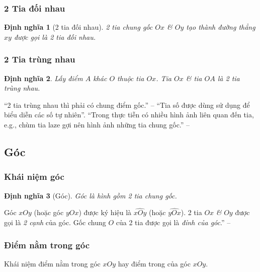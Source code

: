 \documentclass{article}
\numberwithin{equation}{section}
\newtheorem{dinhnghia}{Định nghĩa}[section]
\begin{document}
\subsubsection{2 Tia đối nhau}

\begin{dinhnghia}[2 tia đối nhau]
	2 tia chung gốc $Ox$ \textit{\&} $Oy$ tạo thành đường thẳng $xy$ được gọi là \emph{2 tia đối nhau}.
\end{dinhnghia}

\subsubsection{2 Tia trùng nhau}

\begin{dinhnghia}
	Lấy điểm $A$ khác $O$ thuộc tia $Ox$. Tia $Ox$ \textit{\&} tia $OA$ là \emph{2 tia trùng nhau}.
\end{dinhnghia}
``2 tia trùng nhau thì phải có chung điểm gốc.'' -- \cite[p. 91]{SGK_Toan_6_Canh_Dieu_tap_2} ``Tia số được dùng sử dụng để biểu diễn các số tự nhiên''. ``Trong thực tiễn có nhiều hình ảnh liên quan đến tia, e.g., chùm tia laze gợi nên hình ảnh những tia chung gốc.'' -- \cite[p. 93]{SGK_Toan_6_Canh_Dieu_tap_2}


\subsection{Góc}

\subsubsection{Khái niệm góc}

\begin{dinhnghia}[Góc]
	\emph{Góc} là hình gồm 2 tia chung gốc.
\end{dinhnghia}
Góc $xOy$  (hoặc góc $yOx$) được ký hiệu là $\widehat{xOy}$ (hoặc $\widehat{yOx}$). 2 tia $Ox$ \textit{\&} $Oy$ được gọi là \textit{2 cạnh} của góc. Gốc chung $O$ của 2 tia được gọi là \textit{đỉnh của góc}.'' -- \cite[p. 94]{SGK_Toan_6_Canh_Dieu_tap_2}

\subsubsection{Điểm nằm trong góc}
Khái niệm điểm nằm trong góc $xOy$ hay điểm trong của góc $xOy$.
\end{document}
